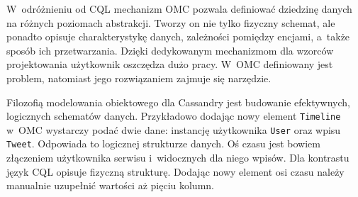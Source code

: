 W~odróżnieniu od CQL mechanizm OMC pozwala definiować dziedzinę danych na różnych poziomach abstrakcji. Tworzy on nie tylko fizyczny schemat, ale ponadto opisuje charakterystykę danych, zależności pomiędzy encjami, a~także sposób ich przetwarzania. Dzięki dedykowanym mechanizmom dla wzorców projektowania użytkownik oszczędza dużo pracy. W~OMC definiowany jest problem, natomiast jego rozwiązaniem zajmuje się narzędzie.

Filozofią modelowania obiektowego dla Cassandry jest budowanie efektywnych, logicznych schematów danych. Przykładowo dodając nowy element \verb+Timeline+ w~OMC wystarczy podać dwie dane: instancję użytkownika \verb+User+ oraz wpisu \verb+Tweet+. Odpowiada to logicznej strukturze danych. Oś czasu jest bowiem złączeniem użytkownika serwisu i~widocznych dla niego wpisów. Dla kontrastu język CQL opisuje fizyczną strukturę. Dodając nowy element osi czasu należy manualnie uzupełnić wartości aż pięciu kolumn.